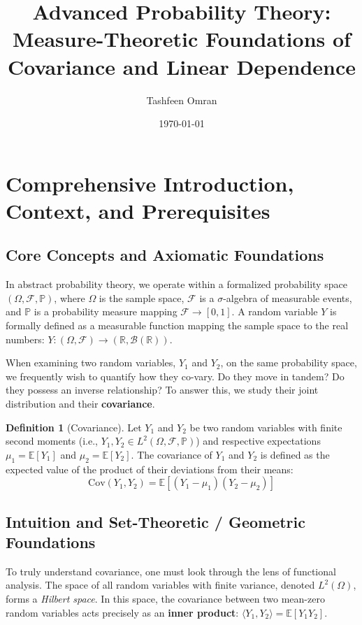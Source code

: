 \documentclass[11pt, a4paper]{article}
\theoremstyle{definition}
\newtheorem{definition}{Definition}[section]
\theoremstyle{remark}
\newcommand{\R}{\mathbb{R}}
\newcommand{\E}{\mathbb{E}}
\newcommand{\Prob}{\mathbb{P}}
\newcommand{\F}{\mathcal{F}}
\newcommand{\Cov}{\mathrm{Cov}}
\begin{document}
\title{\textbf{Advanced Probability Theory: \\ \Large Measure-Theoretic Foundations of Covariance and Linear Dependence}}
\author{Tashfeen Omran}
\date{\today}

\maketitle

\tableofcontents
\newpage

\section{Comprehensive Introduction, Context, and Prerequisites}

\subsection{Core Concepts and Axiomatic Foundations}
In abstract probability theory, we operate within a formalized probability space $(\Omega, \F, \Prob)$, where $\Omega$ is the sample space, $\F$ is a $\sigma$-algebra of measurable events, and $\Prob$ is a probability measure mapping $\F \to [0, 1]$. A random variable $Y$ is formally defined as a measurable function mapping the sample space to the real numbers: $Y: (\Omega, \F) \to (\R, \mathcal{B}(\R))$.

When examining two random variables, $Y_1$ and $Y_2$, on the same probability space, we frequently wish to quantify how they co-vary. Do they move in tandem? Do they possess an inverse relationship? To answer this, we study their joint distribution and their \textbf{covariance}.

\begin{definition}[Covariance]
Let $Y_1$ and $Y_2$ be two random variables with finite second moments (i.e., $Y_1, Y_2 \in L^2(\Omega, \F, \Prob)$) and respective expectations $\mu_1 = \E[Y_1]$ and $\mu_2 = \E[Y_2]$. The covariance of $Y_1$ and $Y_2$ is defined as the expected value of the product of their deviations from their means:
\[
\Cov(Y_1, Y_2) = \E[(Y_1 - \mu_1)(Y_2 - \mu_2)]
\]
\end{definition}

\subsection{Intuition and Set-Theoretic / Geometric Foundations}
To truly understand covariance, one must look through the lens of functional analysis. The space of all random variables with finite variance, denoted $L^2(\Omega)$, forms a \textit{Hilbert space}. In this space, the covariance between two mean-zero random variables acts precisely as an \textbf{inner product}: $\langle Y_1, Y_2 \rangle = \E[Y_1 Y_2]$.
\end{document}
